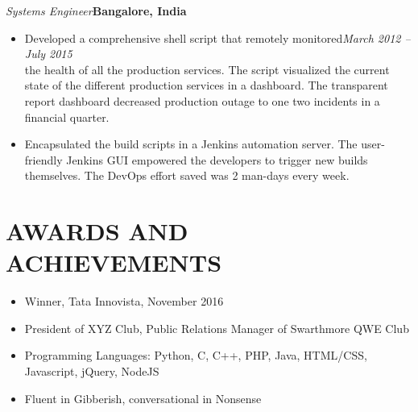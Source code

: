 \documentclass[11pt,a4paper,roman]{moderncv}        %
\begin{document}
{\begin{flushleft}
\textit{Systems Engineer}\hspace{315.0pt}\textbf{Bangalore, India}
\begin{itemize}
    \item Developed a comprehensive shell script that remotely monitored\hspace{45.0pt}\textit{March 2012 – July 2015}\\ the health of all the production services. The script visualized the current state of the different production services in a dashboard. The transparent report dashboard decreased production outage to one two incidents in a financial quarter.
    \item Encapsulated the build scripts in a Jenkins automation server. The user-friendly Jenkins GUI empowered the developers to trigger new builds themselves. The DevOps effort saved was 2 man-days every week.
\end{itemize}
\end{flushleft}



\section{AWARDS AND ACHIEVEMENTS}
\begin{minipage}{\maincolumnwidth}%
	\small{
    	\begin{itemize}
          \item Winner, Tata Innovista, November 2016
          \item President of XYZ Club, Public Relations Manager of Swarthmore QWE Club
          \item Programming Languages: Python, C, C++, PHP, Java, HTML/CSS, Javascript, jQuery, NodeJS
          \item Fluent in Gibberish, conversational in Nonsense
		\end{itemize}}%
\end{minipage}%
      
}
\nocite{*}



\end{document}

